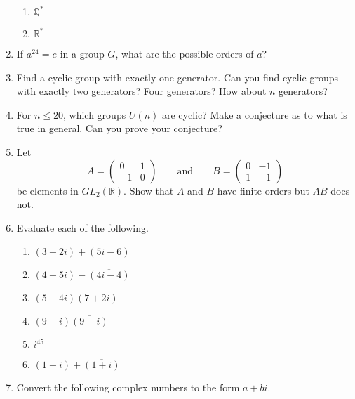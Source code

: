 \documentclass[12pt,reqno]{amsart}
\begin{document}
\begin{enumerate}[{\bf 1.}]
\begin{multicols}{3}
\begin{enumerate}
 \item
${\mathbb Q}^\ast$
 
 \item
${\mathbb R}^\ast$
 
\end{enumerate}
 \end{multicols}
 
\item
If $a^{24} =e$ in a group $G$, what are the possible orders of $a$? 
 
 
\item
Find a cyclic group with exactly one generator.  Can you find cyclic
groups with exactly two generators?  Four generators?  How about $n$
generators?
 
 
\item
For $n \leq 20$, which groups $U(n)$ are cyclic?  Make a conjecture as
to what is true in general.  Can you prove your conjecture?  
 
 
\item
Let
\[
A=
\begin{pmatrix}
0 & 1 \\
-1 & 0
\end{pmatrix}
\qquad \text{and} \qquad
B=
\begin{pmatrix}
0 & -1 \\
1 & -1
\end{pmatrix}
\]
be elements in $GL_2( {\mathbb R} )$. Show that $A$ and $B$ have finite
orders but $AB$ does not. 
 
 
\item
Evaluate each of the following.
\begin{multicols}{2}
\begin{enumerate}
 
\item
$(3-2i)+ (5i-6)$

 
\item
 $(4-5i)-\overline{(4i -4)}$
 
 \item
$(5-4i)(7+2i)$
 
\item
$(9-i) \overline{(9-i)}$
 
 \item
$i^{45}$

\item
$(1+i)+\overline{(1+i)}$
 
\end{enumerate}
\end{multicols}
 
 \item   %
Convert the following complex numbers to the form $a + bi$.
\begin{multicols}{2}
\begin{enumerate}


\end{enumerate}
\end{multicols}
\end{enumerate}
\end{document}
